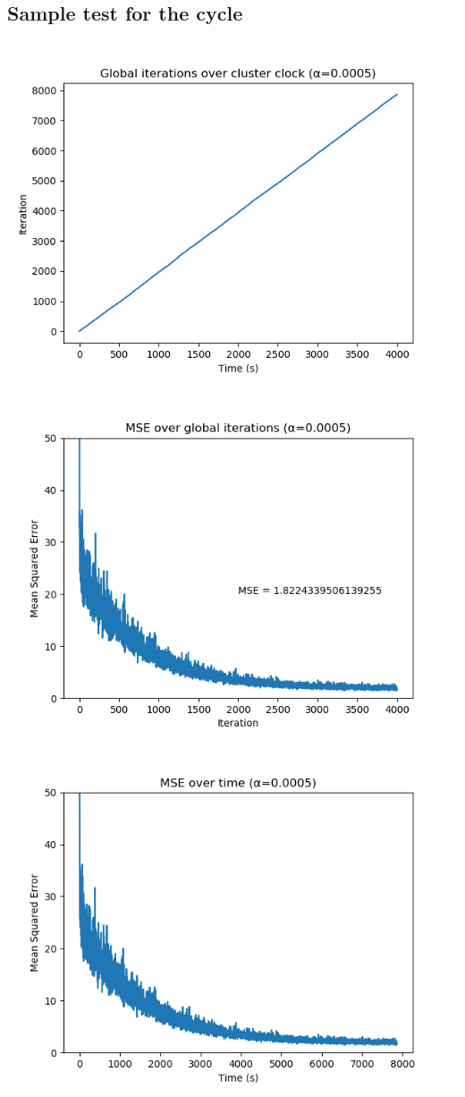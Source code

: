 \documentclass[a4paper,12pt]{article}
\theoremstyle{newplanestyle}
\theoremstyle{newdefinitionstyle}
\theoremstyle{newprovestyle}
\begin{document}
\subsection*{Sample test for the cycle}
\includegraphics[scale=0.6]{iter_time_cycle}

\includegraphics[scale=0.6]{mse_iter_cycle}

\includegraphics[scale=0.6]{mse_time_cycle}
\end{document}
